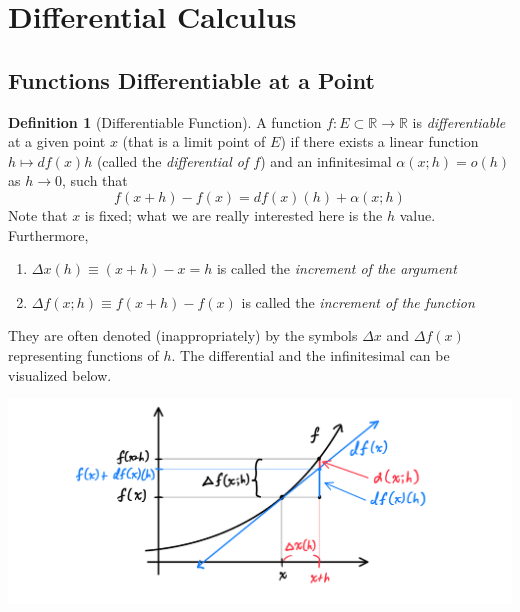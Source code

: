 \documentclass{article}
\theoremstyle{remark}
\theoremstyle{definition}
\newtheorem{definition}{Definition}[section]
\begin{document}
\section{Differential Calculus}
\subsection{Functions Differentiable at a Point}
\begin{definition}[Differentiable Function]
A function $f: E \subset \mathbb{R} \longrightarrow \mathbb{R}$ is \textit{differentiable} at a given point $x$ (that is a limit point of $E$) if there exists a linear function $h \mapsto df(x) h$ (called the \textit{differential of $f$}) and an infinitesimal $\alpha (x;h) = o(h)$ as $h \rightarrow 0$, such that
\[f(x + h) - f(x) = df(x) (h) + \alpha (x; h)\]
Note that $x$ is fixed; what we are really interested here is the $h$ value. Furthermore, 
\begin{enumerate}
    \item $\Delta x(h) \equiv (x + h) - x = h$ is called the \textit{increment of the argument}
    \item $\Delta f(x;h) \equiv f(x + h) - f(x)$ is called the \textit{increment of the function} 
\end{enumerate}
They are often denoted (inappropriately) by the symbols $\Delta x$ and $\Delta f(x)$ representing functions of $h$. The differential and the infinitesimal can be visualized below. 
\begin{center}
    \includegraphics[scale=0.3]{img/Differential_Diagram.PNG}
\end{center}
\end{definition}
\end{document}
